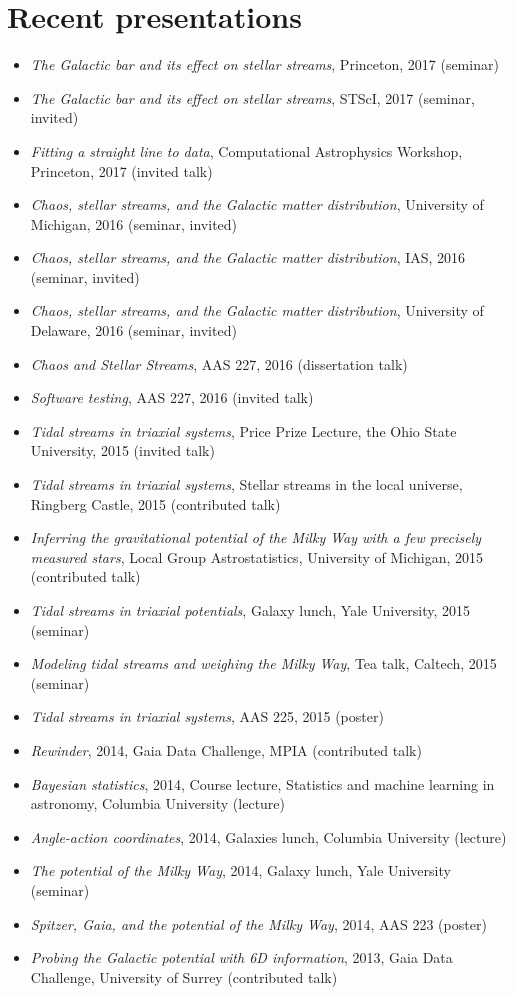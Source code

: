 \documentclass[12pt,letterpaper]{article}
\begin{document}
\section*{Recent presentations}

\begin{itemize}
    \item \emph{The Galactic bar and its effect on stellar streams}, Princeton, 2017 (seminar)
    \item \emph{The Galactic bar and its effect on stellar streams}, STScI, 2017 (seminar, invited)
    \item \emph{Fitting a straight line to data}, Computational Astrophysics Workshop, Princeton, 2017 (invited talk)
    \item \emph{Chaos, stellar streams, and the Galactic matter distribution}, University of Michigan, 2016 (seminar, invited)
    \item \emph{Chaos, stellar streams, and the Galactic matter distribution}, IAS, 2016 (seminar, invited)
    \item \emph{Chaos, stellar streams, and the Galactic matter distribution}, University of Delaware, 2016 (seminar, invited)
	\item \emph{Chaos and Stellar Streams}, AAS 227, 2016 (dissertation talk)
    \item \emph{Software testing}, AAS 227, 2016 (invited talk)
    \item \emph{Tidal streams in triaxial systems}, Price Prize Lecture, the Ohio State University, 2015 (invited talk)
	\item \emph{Tidal streams in triaxial systems}, Stellar streams in the local universe, Ringberg Castle, 2015 (contributed talk)
    \item \emph{Inferring the gravitational potential of the Milky Way with a few precisely measured stars}, Local Group Astrostatistics, University of Michigan, 2015 (contributed talk)
    \item \emph{Tidal streams in triaxial potentials}, Galaxy lunch, Yale University, 2015 (seminar)
	\item \emph{Modeling tidal streams and weighing the Milky Way}, Tea talk, Caltech, 2015 (seminar)
	\item \emph{Tidal streams in triaxial systems}, AAS 225, 2015 (poster)
	\item \emph{Rewinder}, 2014, Gaia Data Challenge, MPIA (contributed talk)
	\item \emph{Bayesian statistics}, 2014, Course lecture, Statistics and machine learning in astronomy, Columbia University (lecture)
	\item \emph{Angle-action coordinates}, 2014, Galaxies lunch, Columbia University (lecture)
	\item \emph{The potential of the Milky Way}, 2014, Galaxy lunch, Yale University (seminar)
	\item \emph{Spitzer, Gaia, and the potential of the Milky Way}, 2014, AAS 223 (poster)
	\item \emph{Probing the Galactic potential with 6D information}, 2013, Gaia Data Challenge, University of Surrey (contributed talk)

\end{itemize}
\end{document}
